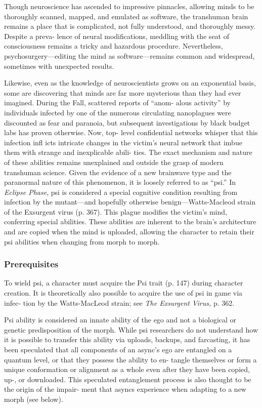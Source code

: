 

Though neuroscience has ascended to impressive 
pinnacles, allowing minds to be thoroughly scanned, 
mapped, and emulated as software, the transhuman 
brain remains a place that is complicated, not fully 
understood, and thoroughly messy. Despite a preva-
lence of neural modifications, meddling with the seat 
of consciousness remains a tricky and hazardous 
procedure. Nevertheless, psychosurgery—editing the 
mind as software—remains common and widespread, 
sometimes with unexpected results.

Likewise, even as the knowledge of neuroscientists 
grows on an exponential basis, some are discovering 
that minds are far more mysterious than they had ever 
imagined. During the Fall, scattered reports of ``anom-
alous activity'' by individuals infected by one of the 
numerous circulating nanoplagues were discounted 
as fear and paranoia, but subsequent investigations 
by black budget labs has proven otherwise. Now, top-
level confidential networks whisper that this infection 
infl icts intricate changes in the victim's neural network 
that imbue them with strange and inexplicable abili-
ties. The exact mechanism and nature of these abilities 
remains unexplained and outside the grasp of modern 
transhuman science. Given the evidence of a new 
brainwave type and the paranormal nature of this 
phenomenon, it is loosely referred to as ``psi.''
In \textit{Eclipse Phase}, psi is considered a special cognitive 
condition resulting from infection by the mutant—and 
hopefully otherwise benign—Watts-Macleod strain 
of the Exsurgent virus (p. 367). This plague modifies 
the victim's mind, conferring special abilities. These 
abilities are inherent to the brain's architecture and 
are copied when the mind is uploaded, allowing the 
character to retain their psi abilities when changing 
from morph to morph.

\subsubsection{Prerequisites}

To wield psi, a character must acquire the Psi trait (p. 
147) during character creation. It is theoretically also 
possible to acquire the use of psi in game via infec-
tion by the Watts-MacLeod strain; see \textit{The Exsurgent }
\textit{Virus,} p. 362.

Psi ability is considered an innate ability of the 
ego and not a biological or genetic predisposition of 
the morph. While psi researchers do not understand 
how it is possible to transfer this ability via uploads, 
backups, and farcasting, it has been speculated that 
all components of an async's ego are entangled on a 
quantum level, or that they possess the ability to en-
tangle themselves or form a unique conformation or 
alignment as a whole even after they have been copied, 
up-, or downloaded. This speculated entanglement 
process is also thought to be the origin of the impair-
ment that asyncs experience when adapting to a new 
morph (see below).

